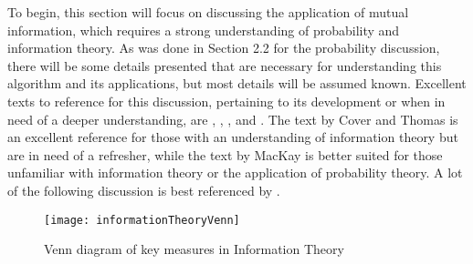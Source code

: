 %
%
%
%
%
%
%
%
%

%
%
%



To begin, this section will focus on discussing the application of mutual information, which requires a strong understanding of probability and information theory. As was done in Section 2.2 for the probability discussion, there will be some details presented that are necessary for understanding this algorithm and its applications, but most details will be assumed known. Excellent texts to reference for this discussion, pertaining to its development or when in need of a deeper understanding, are \cite{Reza1994}, \cite{MacKay2004}, \cite{Kullback1997}, and \cite{Cover2006}. The text by Cover and Thomas \cite{Cover2006} is an excellent reference for those with an understanding of information theory but are in need of a refresher, while the text by MacKay \cite{MacKay2004} is better suited for those unfamiliar with information theory or the application of probability theory. A lot of the following discussion is best referenced by \cite{Cover2006}.

\begin{figure}[h]
\centering
\texttt{[image: informationTheoryVenn]}
\caption{Venn diagram of key measures in Information Theory}
\label{informationTheory}
\end{figure}

